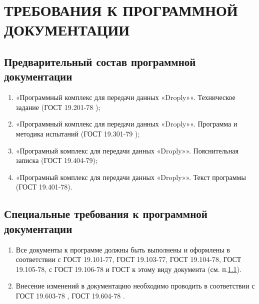 \section{ТРЕБОВАНИЯ К ПРОГРАММНОЙ ДОКУМЕНТАЦИИ}

\subsection{Предварительный состав программной документации}
\label{docs.list}

\begin{enumerate}
    \item «Программный комплекс для передачи данных «Droply»». Техническое задание (ГОСТ 19.201-78 \cite{gost:19.201-78});
    \item «Программный комплекс для передачи данных «Droply»». Программа и методика испытаний
    (ГОСТ 19.301-79 \cite{gost:19.301-79});
    \item «Програмный комплекс для передачи данных «Droply»». Пояснительная записка (ГОСТ 19.404-79);
    \item «Програмный комплекс для передачи данных «Droply»». Текст программы (ГОСТ 19.401-78).

\end{enumerate}

\subsection{Специальные требования к программной документации}
\label{docs.extra}

\begin{enumerate}
    \item Все документы к программе должны быть выполнены и оформлены в соответствии с
    ГОСТ 19.101-77, ГОСТ 19.103-77, ГОСТ 19.104-78, ГОСТ 19.105-78, с ГОСТ 19.106-78 и ГОСТ к этому виду документа (см. п.\ref{docs.list}).
    \item Внесение изменений в документацию необходимо проводить в соответствии с ГОСТ 19.603-78 \cite{gost:19.603-78}, ГОСТ 19.604-78 \cite{gost:19.604-78}.
\end{enumerate}

\clearpage